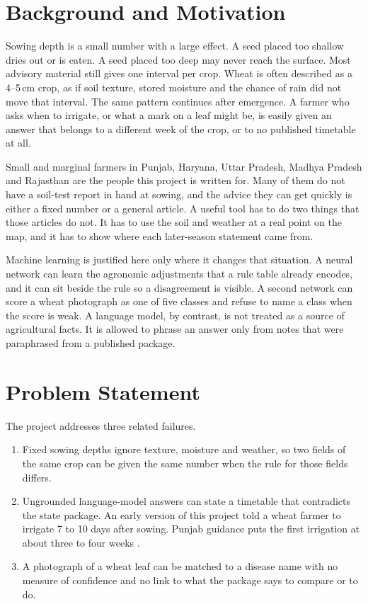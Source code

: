 \section{Background and Motivation}
Sowing depth is a small number with a large effect. A seed placed too shallow dries out or is eaten. A seed placed too deep may never reach the surface. Most advisory material still gives one interval per crop. Wheat is often described as a 4--5\,cm crop, as if soil texture, stored moisture and the chance of rain did not move that interval. The same pattern continues after emergence. A farmer who asks when to irrigate, or what a mark on a leaf might be, is easily given an answer that belongs to a different week of the crop, or to no published timetable at all.

Small and marginal farmers in Punjab, Haryana, Uttar Pradesh, Madhya Pradesh and Rajasthan are the people this project is written for. Many of them do not have a soil-test report in hand at sowing, and the advice they can get quickly is either a fixed number or a general article. A useful tool has to do two things that those articles do not. It has to use the soil and weather at a real point on the map, and it has to show where each later-season statement came from.

Machine learning is justified here only where it changes that situation. A neural network can learn the agronomic adjustments that a rule table already encodes, and it can sit beside the rule so a disagreement is visible. A second network can score a wheat photograph as one of five classes and refuse to name a class when the score is weak. A language model, by contrast, is not treated as a source of agricultural facts. It is allowed to phrase an answer only from notes that were paraphrased from a published package.

\section{Problem Statement}
The project addresses three related failures.

\begin{enumerate}[leftmargin=1.4em]
    \item Fixed sowing depths ignore texture, moisture and weather, so two fields of the same crop can be given the same number when the rule for those fields differs.
    \item Ungrounded language-model answers can state a timetable that contradicts the state package. An early version of this project told a wheat farmer to irrigate 7 to 10 days after sowing. Punjab guidance puts the first irrigation at about three to four weeks \cite{pau2025rabi}.
    \item A photograph of a wheat leaf can be matched to a disease name with no measure of confidence and no link to what the package says to compare or to do.
\end{enumerate}


